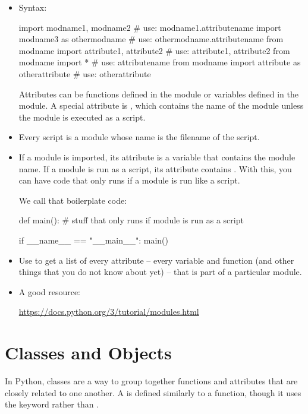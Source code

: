 \documentclass[11pt]{cselabheader}
\begin{document}
\begin{itemize}
  \item Syntax:

    \begin{python3code}
import modname1, modname2 # use: modname1.attributename
import modname3 as othermodname # use: othermodname.attributename
from modname import attribute1, attribute2 # use: attribute1, attribute2
from modname import * # use: attributename
from modname import attribute as otherattribute # use: otherattribute
    \end{python3code}

    Attributes can be functions defined in the module or variables defined in
    the module. A special attribute is , which contains
    the name of the module unless the module is executed as a script.

  \item Every script is a module whose name is the filename of the script.

  \item If a module is imported, its  attribute is a
    variable that contains the module name. If a module is run as a script, its
     attribute contains . With
    this, you can have code that only runs if a module is run like a script.

    We call that boilerplate code:

    \begin{python3code}
def main():
    # stuff that only runs if module is run as a script

if __name__ == "__main__":
    main()
    \end{python3code}

  \item Use  to get a list of every attribute -- every
    variable and function (and other things that you do not know about yet) --
    that is part of a particular module.

  \item A good resource:

    \begin{center}
      \url{https://docs.python.org/3/tutorial/modules.html}
    \end{center}

\end{itemize}


\section{Classes and Objects}
\label{sec:classes}
In Python, classes are a way to group together functions and attributes
that are closely related to one another. A  is defined
similarly to a function, though it uses the  keyword rather
than .
\end{document}

